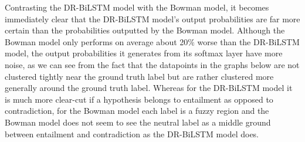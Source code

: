 \documentclass[12pt,letterpaper]{article}
\begin{document}
Contrasting the DR-BiLSTM model with the Bowman model, it becomes immediately clear that the DR-BiLSTM model's output probabilities are far more certain than the probabilities outputted by the Bowman model. Although the Bowman model only performs on average about 20$\%$ worse than the DR-BiLSTM model, the output probabilities it generates from its softmax layer have more noise, as we can see from the fact that the datapoints in the graphs below are not clustered tightly near the ground truth label but are rather clustered more generally around the ground truth label. Whereas for the DR-BiLSTM model it is much more clear-cut if a hypothesis belongs to entailment as opposed to contradiction, for the Bowman model each label is a fuzzy region and the Bowman model does not seem to see the neutral label as a middle ground between entailment and contradiction as the DR-BiLSTM model does.
\end{document}
